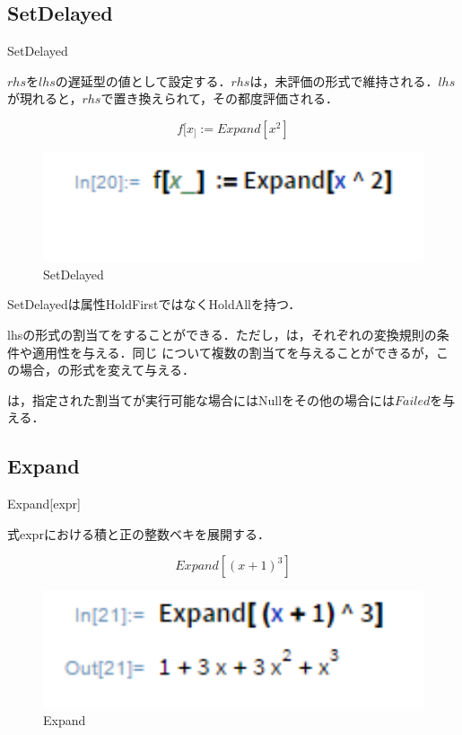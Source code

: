 \subsection {SetDelayed}

SetDelayed

$rhs$を$lhs$の遅延型の値として設定する．$rhs$は，未評価の形式で維持される．$lhs$が現れると，$rhs$で置き換えられて，その都度評価される．

\[f[x_] := Expand[x^2]\]

\begin{figure}[h]
\centering
\includegraphics[width=15cm]{fx.png}
\caption{SetDelayed}\label{図}
\end{figure}

SetDelayedは属性HoldFirstではなくHoldAllを持つ．

lhsの形式の割当てをすることができる．ただし，は，それぞれの変換規則の条件や適用性を与える．同じ について複数の割当てを与えることができるが，この場合，の形式を変えて与える．

は，指定された割当てが実行可能な場合にはNullをその他の場合には$Failed$を与える．

\clearpage

\subsection {Expand}

Expand[expr]

式exprにおける積と正の整数ベキを展開する．

\[Expand[(x+1)^3]\]

\begin{figure}[h]
\centering
\includegraphics[width=15cm]{expand.png}
\caption{Expand}\label{図}
\end{figure}

